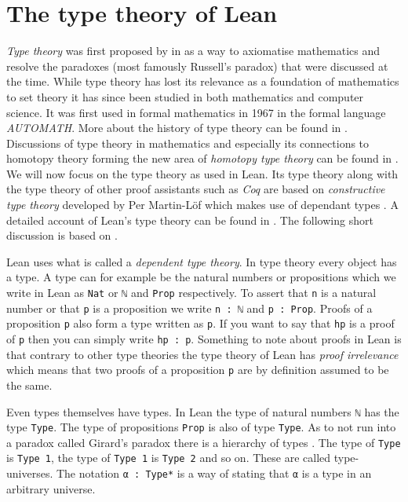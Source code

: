 \section{The type theory of Lean}
\label{sec:typetheory}

\emph{Type theory} was first proposed by  in \citeyear{Russell1908} \cite{Russell1908} as a way to axiomatise mathematics and resolve the paradoxes (most famously Russell's paradox) that were discussed at the time. 
While type theory has lost its relevance as a foundation of mathematics to set theory it has since been studied in both mathematics and computer science. 
It was first used in formal mathematics in 1967 in the formal language \emph{AUTOMATH}. 
More about the history of type theory can be found in \cite{Kamareddine2004}. 
Discussions of type theory in mathematics and especially its connections to homotopy theory forming the new area of \emph{homotopy type theory} can be found in \cite{hottbook}.
We will now focus on the type theory as used in Lean.
Its type theory along with the type theory of other proof assistants such as \emph{Coq} are based on \emph{constructive type theory} developed by Per Martin-Löf which makes use of dependant types \cite{Martin-Löf1984}.
A detailed account of Lean's type theory can be found in \cite{Carneiro2019}. 
The following short discussion is based on \cite{Avigad2024}. 

Lean uses what is called a \emph{dependent type theory}.
In type theory every object has a type. 
A type can for example be the natural numbers or propositions which we write in Lean as \lstinline{Nat} or \lstinline{ℕ} and \lstinline{Prop} respectively.
To assert that \lstinline{n} is a natural number or that \lstinline{p} is a proposition we write \lstinline{n : ℕ} and \lstinline{p : Prop}. 
Proofs of a proposition \lstinline{p} also form a type written as \lstinline{p}.
If you want to say that \lstinline{hp} is a proof of \lstinline{p} then you can simply write \lstinline{hp : p}.
Something to note about proofs in Lean is that contrary to other type theories the type theory of Lean has \emph{proof irrelevance} which means that two proofs of a proposition \lstinline{p} are by definition assumed to be the same.

Even types themselves have types. 
In Lean the type of natural numbers \lstinline{ℕ} has the type \lstinline{Type}. 
The type of propositions \lstinline{Prop} is also of type \lstinline{Type}.
As to not run into a paradox called Girard's paradox there is a hierarchy of types \cite{Coquand1986}. 
The type of \lstinline{Type} is \lstinline{Type 1}, the type of \lstinline{Type 1} is \lstinline{Type 2} and so on.
These are called type-universes. 
The notation \lstinline{α : Type*} is a way of stating that \lstinline{α} is a type in an arbitrary universe.

